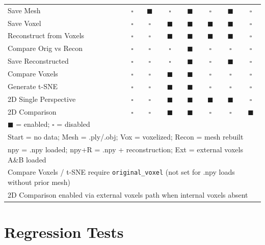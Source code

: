 \documentclass[12pt,a4paper]{article}
\begin{document}
{\begin{longtable}{lccccccc}
Save Mesh                & $\square$ & $\blacksquare$ & $\square$ & $\blacksquare$ & $\square$ & $\blacksquare$ & $\square$ \\
Save Voxel               & $\square$ & $\square$ & $\blacksquare$ & $\blacksquare$ & $\blacksquare$ & $\blacksquare$ & $\square$ \\
Reconstruct from Voxels  & $\square$ & $\square$ & $\blacksquare$ & $\blacksquare$ & $\blacksquare$ & $\blacksquare$ & $\square$ \\
Compare Orig vs Recon    & $\square$ & $\square$ & $\square$ & $\blacksquare$ & $\square$ & $\square$ & $\square$ \\
Save Reconstructed       & $\square$ & $\square$ & $\square$ & $\blacksquare$ & $\square$ & $\blacksquare$ & $\square$ \\
Compare Voxels           & $\square$ & $\square$ & $\blacksquare$ & $\blacksquare$ & $\square$ & $\square$ & $\square$ \\
Generate t-SNE           & $\square$ & $\square$ & $\blacksquare$ & $\blacksquare$ & $\square$ & $\square$ & $\square$ \\
2D Single Perspective    & $\square$ & $\square$ & $\blacksquare$ & $\blacksquare$ & $\blacksquare$ & $\blacksquare$ & $\square$ \\
2D Comparison            & $\square$ & $\square$ & $\blacksquare$ & $\blacksquare$ & $\square$ & $\square$ & $\blacksquare$ \\
\bottomrule
\multicolumn{8}{l}{\footnotesize $\blacksquare$ = enabled; $\square$ = disabled} \\
\multicolumn{8}{l}{\footnotesize Start = no data; Mesh = .ply/.obj; Vox = voxelized; Recon = mesh rebuilt} \\
\multicolumn{8}{l}{\footnotesize npy = .npy loaded; npy+R = .npy + reconstruction; Ext = external voxels A\&B loaded} \\
\multicolumn{8}{l}{\footnotesize Compare Voxels / t-SNE require \texttt{original\_voxel} (not set for .npy loads without prior mesh)} \\
\multicolumn{8}{l}{\footnotesize 2D Comparison enabled via external voxels path when internal voxels absent} \\
\end{longtable}
}
\normalsize

\section{Regression Tests}
\end{document}
